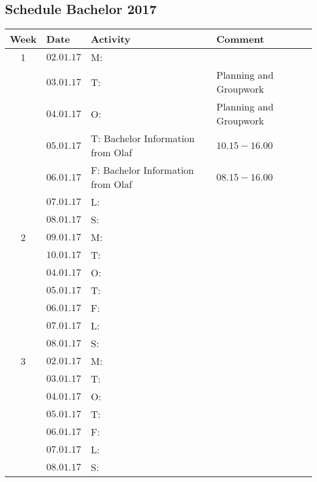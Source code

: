 \begin{center}
\section*{\textbf{Schedule Bachelor 2017}}
\begin{tabular}{|c|l|l|l|}
\hline
\rowcolor{cadetgrey}
\textbf{Week}    &\textbf{Date} 	 &\textbf{Activity}     &\textbf{Comment}  \\
\hline
1	      & $02.01.17$       & M:    &                         \\\rowcolor{gainsboro}
          & $03.01.17$       & T:    & Planning and Groupwork  \\
          & $04.01.17$       & O:    & Planning and Groupwork  \\\rowcolor{gainsboro}
          & $05.01.17$       & T: Bachelor Information from Olaf & $10.15-16.00$ \\
          & $06.01.17$       & F: Bachelor Information from Olaf & $08.15-16.00$ \\\rowcolor{gainsboro}
          & $07.01.17$       & L:    &             \\    
          & $08.01.17$       & S:    &             \\
\hline                                                \rowcolor{gainsboro}    
2	      & $09.01.17$       & M:    &             \\
          & $10.01.17$       & T:    &             \\ \rowcolor{gainsboro}
          & $04.01.17$       & O:    &             \\
          & $05.01.17$       & T:    &             \\ \rowcolor{gainsboro}
          & $06.01.17$       & F:    &             \\
          & $07.01.17$       & L:    &             \\ \rowcolor{gainsboro}  
          & $08.01.17$       & S:    &             \\
\hline                                                         
3	      & $02.01.17$       & M:    &              \\\rowcolor{gainsboro}
          & $03.01.17$       & T:    &              \\
          & $04.01.17$       & O:    &              \\\rowcolor{gainsboro}
          & $05.01.17$       & T:    &              \\
          & $06.01.17$       & F:    &              \\\rowcolor{gainsboro}
          & $07.01.17$       & L:    &              \\    
          & $08.01.17$       & S:    &              \\
\hline
\end{tabular}                                                                   
\end{center}




